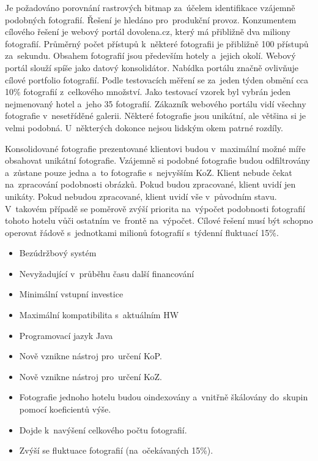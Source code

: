Je požadováno porovnání rastrových bitmap za~účelem identifikace vzájemně podobných fotografií. Řešení je hledáno pro~produkční provoz. Konzumentem cílového řešení je webový portál dovolena.cz, který má přibližně dva miliony fotografií. Průměrný počet přístupů k~některé fotografii je přibližně 100 přístupů za~sekundu. Obsahem fotografií jsou především hotely a~jejich okolí. Webový portál slouží spíše jako datový konsolidátor. Nabídka portálu značně ovlivňuje cílové portfolio fotografií. Podle testovacích měření se za~jeden týden obmění cca 10\% fotografií z~celkového množství. Jako testovací vzorek byl vybrán jeden nejmenovaný hotel a~jeho 35 fotografií. Zákazník webového portálu vidí všechny fotografie v~nesetříděné galerii. Některé fotografie jsou unikátní, ale většina si je velmi podobná. U~některých dokonce nejsou lidským okem patrné rozdíly.

Konsolidované fotografie prezentované klientovi budou v~maximální možné míře obsahovat unikátní fotografie. Vzájemně si podobné fotografie budou odfiltrovány a~zůstane pouze jedna a~to fotografie s~nejvyšším KoZ. Klient nebude čekat na~zpracování podobnosti obrázků. Pokud budou zpracované, klient uvidí jen unikáty. Pokud nebudou zpracované, klient uvidí vše v~původním stavu. V~takovém případě se poměrově zvýší priorita na~výpočet podobnosti fotografií tohoto hotelu vůči ostatním ve~frontě na~výpočet. Cílové řešení musí být schopno operovat řádově s~jednotkami milionů fotografií s~týdenní fluktuací 15\%.

\begin{itemize}
	\setlength{\parskip}{0pt}
	\setlength{\itemsep}{0pt}
	\item {Bezúdržbový systém}
	\item {Nevyžadující v~průběhu času další financování}
	\item {Minimální vstupní investice}
	\item {Maximální kompatibilita s~aktuálním HW}
	\item {Programovací jazyk Java~\cite{java}}
\end{itemize}

\begin{itemize}
	\setlength{\parskip}{0pt}
	\setlength{\itemsep}{0pt}
	\item {Nově vznikne nástroj pro~určení KoP.}
	\item {Nově vznikne nástroj pro~určení KoZ.}
	\item {Fotografie jednoho hotelu budou oindexovány a~vnitřně škálovány do~skupin pomocí koeficientů výše.}
	\item {Dojde k~navýšení celkového počtu fotografií.}
	\item {Zvýší se fluktuace fotografií (na~očekávaných 15\%).}
\end{itemize}

